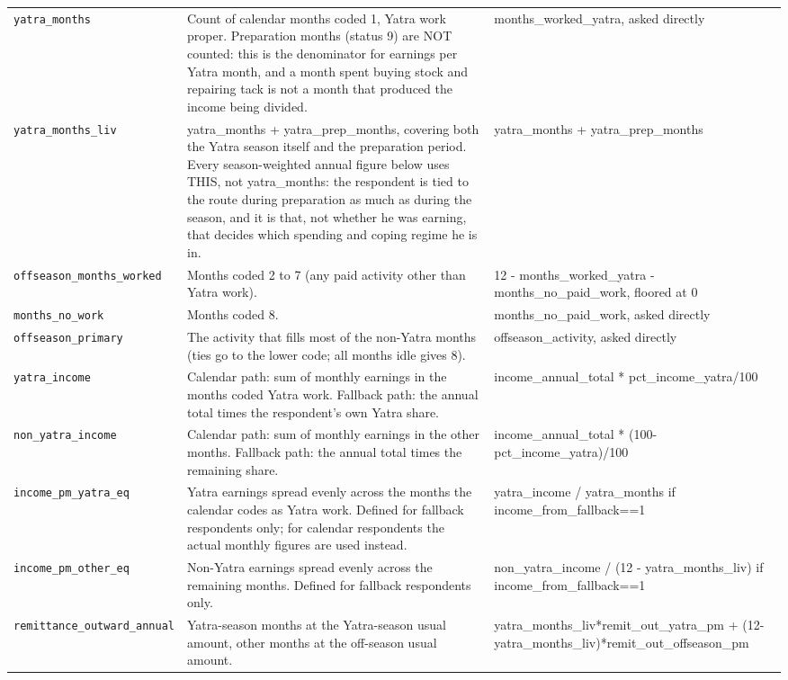 \documentclass[10pt]{article}
\begin{document}
{\begin{longtable}{p{3.3cm}p{7.6cm}p{5.7cm}}
\texttt{yatra\_months} & Count of calendar months coded 1, Yatra work proper. Preparation months (status 9) are NOT counted: this is the denominator for earnings per Yatra month, and a month spent buying stock and repairing tack is not a month that produced the income being divided. & months\_worked\_yatra, asked directly \\
\texttt{yatra\_months\_liv} & yatra\_months + yatra\_prep\_months, covering both the Yatra season itself and the preparation period. Every season-weighted annual figure below uses THIS, not yatra\_months: the respondent is tied to the route during preparation as much as during the season, and it is that, not whether he was earning, that decides which spending and coping regime he is in. & yatra\_months + yatra\_prep\_months \\
\texttt{offseason\_months\_worked} & Months coded 2 to 7 (any paid activity other than Yatra work). & 12 - months\_worked\_yatra - months\_no\_paid\_work, floored at 0 \\
\texttt{months\_no\_work} & Months coded 8. & months\_no\_paid\_work, asked directly \\
\texttt{offseason\_primary} & The activity that fills most of the non-Yatra months (ties go to the lower code; all months idle gives 8). & offseason\_activity, asked directly \\
\texttt{yatra\_income} & Calendar path: sum of monthly earnings in the months coded Yatra work. Fallback path: the annual total times the respondent's own Yatra share. & income\_annual\_total * pct\_income\_yatra/100 \\
\texttt{non\_yatra\_income} & Calendar path: sum of monthly earnings in the other months. Fallback path: the annual total times the remaining share. & income\_annual\_total * (100-pct\_income\_yatra)/100 \\
\texttt{income\_pm\_yatra\_eq} & Yatra earnings spread evenly across the months the calendar codes as Yatra work. Defined for fallback respondents only; for calendar respondents the actual monthly figures are used instead. & yatra\_income / yatra\_months if income\_from\_fallback==1 \\
\texttt{income\_pm\_other\_eq} & Non-Yatra earnings spread evenly across the remaining months. Defined for fallback respondents only. & non\_yatra\_income / (12 - yatra\_months\_liv) if income\_from\_fallback==1 \\
\texttt{remittance\_outward\_annual} & Yatra-season months at the Yatra-season usual amount, other months at the off-season usual amount. & yatra\_months\_liv*remit\_out\_yatra\_pm + (12-yatra\_months\_liv)*remit\_out\_offseason\_pm \\

\end{longtable}}
\end{document}
